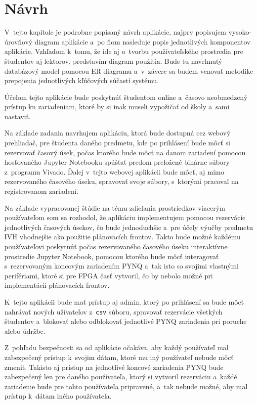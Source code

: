\chapter{Návrh}
\label{Navrh}
V~tejto kapitole je podrobne popísaný návrh aplikácie, najprv popisujem vysoko-úrovňový diagram aplikácie a~po ňom nasleduje popis jednotlivých komponentov aplikácie. Vzhľadom k~tomu, že ide aj o~tvorbu používateľského prostredia pre študentov aj lektorov, predstavím diagram použitia. Bude tu navrhnutý databázový model pomocou ER diagramu a~v~závere sa budem venovať metodike prepojenia jednotlivých kľúčových súčastí systému.

Účelom tejto aplikácie bude poskytnúť študentom online a~časovo neobmedzený prístup ku zariadeniam, ktoré by si inak museli vypožičať od školy a~sami nastaviť.

Na základe zadania navrhujem aplikáciu, ktorá bude dostupná cez webový prehliadač, pre študenta daného predmetu, kde po prihlásení bude môcť si rezervovať časový úsek, počas ktorého bude môcť na danom zariadení pomocou hosťovaného Jupyter Notebooku spúšťať predom preložené binárne súbory z~programu Vivado. Ďalej v~tejto webovej aplikácii bude môcť, aj mimo rezervovaného časového úseku, spravovať svoje súbory, s~ktorými pracoval na registrovanom zariadení.

Na základe vypracovanej štúdie na tému zdieľania prostriedkov viacerým používateľom som sa rozhodol, že aplikáciu implementujem pomocou rezervácie jednotlivých časových úsekov, čo bude jednoduchšie a~pre účely výučby predmetu IVH vhodnejšie ako použitie plánovacích frontov. Takto bude možné každému používateľovi poskytnúť počas rezervovaného časového úseku interaktívne prostredie Jupyter Notebook, pomocou ktorého bude môcť interagovať s~rezervovaným koncovým zariadením PYNQ a~tak isto so svojimi vlastnými perifériami, ktoré si pre FPGA časť vytvoril, čo by nebolo možné pri implementácii plánovacích frontov.

K~tejto aplikácii bude mať prístup aj admin, ktorý po prihlásení sa bude môcť nahrávať nových užívateľov z~\verb|csv| súboru, spravovať rezervácie všetkých študentov a~blokovať alebo odblokovať jednotlivé PYNQ zariadenia pri poruche alebo údržbe.

Z~pohľadu bezpečnosti sa od aplikácie očakáva, aby každý používateľ mal zabezpečený prístup k~svojim dátam, ktoré mu iný používateľ nebude môcť zmeniť. Takisto aj prístup na jednotlivé koncové zariadenia PYNQ bude zabezpečený len pre daného používateľa, ktorý si vytvoril rezerváciu a~každé zariadenie bude pre tohto používateľa pripravené, a~tak nebude možné, aby mal prístup k~dátam iného používateľa.

